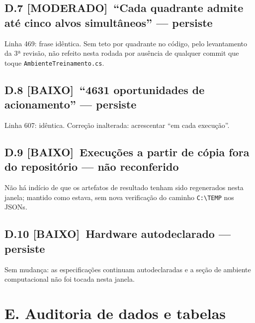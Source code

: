 \documentclass[11pt,a4paper]{article}
\newcommand{\moderado}{\textbf{\color{blue!50!black}[MODERADO]}}
\newcommand{\baixo}{\textbf{\color{gray}[BAIXO]}}
\begin{document}
\subsection*{D.7 \moderado\ ``Cada quadrante admite até cinco alvos simultâneos'' --- persiste}

Linha 469: frase idêntica. Sem teto por quadrante no código, pelo levantamento da 3ª revisão, não
refeito nesta rodada por ausência de qualquer commit que toque \texttt{AmbienteTreinamento.cs}.

\subsection*{D.8 \baixo\ ``4631 oportunidades de acionamento'' --- persiste}

Linha 607: idêntica. Correção inalterada: acrescentar ``em cada execução''.

\subsection*{D.9 \baixo\ Execuções a partir de cópia fora do repositório --- não reconferido}

Não há indício de que os artefatos de resultado tenham sido regenerados nesta janela; mantido como
estava, sem nova verificação do caminho \texttt{C:\textbackslash TEMP} nos JSONs.

\subsection*{D.10 \baixo\ Hardware autodeclarado --- persiste}

Sem mudança: as especificações continuam autodeclaradas e a seção de ambiente computacional não foi
tocada nesta janela.

\section*{E. Auditoria de dados e tabelas}
\end{document}
